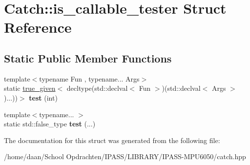 \hypertarget{structCatch_1_1is__callable__tester}{}\section{Catch\+:\+:is\+\_\+callable\+\_\+tester Struct Reference}
\label{structCatch_1_1is__callable__tester}
\subsection*{Static Public Member Functions}
\begin{DoxyCompactItemize}
\item 
\mbox{\label{structCatch_1_1is__callable__tester_a91c513c4fc18b01b96fa0132706f34b3}} 
{\footnotesize template$<$typename Fun , typename... Args$>$ }\\static \hyperlink{structCatch_1_1true__given}{true\+\_\+given}$<$ decltype(std\+::declval$<$ Fun $>$)(std\+::declval$<$ Args $>$)...))$>$ {\bfseries test} (int)
\item 
\mbox{\label{structCatch_1_1is__callable__tester_adce16c4accb860bf46f6491dd70cfd63}} 
{\footnotesize template$<$typename... $>$ }\\static std\+::false\+\_\+type {\bfseries test} (...)
\end{DoxyCompactItemize}


The documentation for this struct was generated from the following file\+:\begin{DoxyCompactItemize}
\item 
/home/daan/\+School Opdrachten/\+I\+P\+A\+S\+S/\+L\+I\+B\+R\+A\+R\+Y/\+I\+P\+A\+S\+S-\/\+M\+P\+U6050/catch.\+hpp\end{DoxyCompactItemize}
